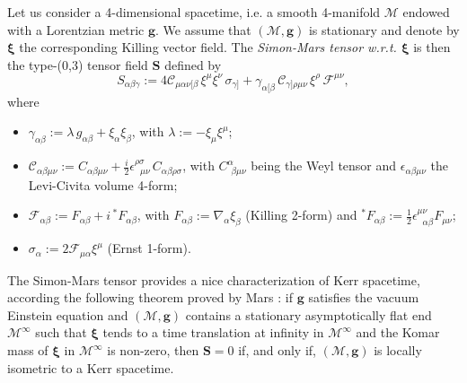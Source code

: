 \documentclass[a4paper]{jpconf}
\newcommand{\be}{\begin{equation}}
\newcommand{\ee}{\end{equation}}
\newcommand{\w}[1]{\bm{#1}}
\begin{document}
Let us consider a 4-dimensional spacetime, i.e. a smooth 
4-manifold $\mathcal{M}$ endowed with a Lorentzian metric $\w{g}$. 
We assume that $(\mathcal{M},\w{g})$ is stationary and denote by $\w{\xi}$ 
the corresponding Killing vector field. 
The \emph{Simon-Mars tensor w.r.t. $\w{\xi}$} is then
the type-(0,3) tensor field $\w{S}$ defined by \cite{Mars99}
\be \label{e:def_Simon-Mars}
S_{\alpha\beta\gamma} := 4 \mathcal{C}_{\mu\alpha\nu[\beta} \, \xi^\mu \xi^\nu \, \sigma_{\gamma]}
 + \gamma_{\alpha[\beta} \, \mathcal{C}_{\gamma]\rho\mu\nu} \, \xi^\rho \, \mathcal{F}^{\mu\nu} ,
\ee
where
\begin{itemize}
\item $\gamma_{\alpha\beta} := \lambda \, g_{\alpha\beta} + \xi_\alpha \xi_\beta$, 
with $\lambda := - \xi_\mu \xi^\mu$;
\item $\mathcal{C}_{\alpha\beta\mu\nu} := C_{\alpha\beta\mu\nu}
    + \frac{i}{2} \epsilon^{\rho\sigma}_{\ \ \, \mu\nu}\,  C_{\alpha\beta\rho\sigma} $,
with $C^\alpha_{\ \, \beta\mu\nu}$ being the Weyl tensor and 
$\epsilon_{\alpha\beta\mu\nu}$ the Levi-Civita volume 4-form;
\item $\mathcal{F}_{\alpha\beta} := F_{\alpha\beta} + i\,  {}^*\!F_{\alpha\beta}$, 
with $F_{\alpha\beta} := \nabla_\alpha\xi_\beta$ (Killing 2-form) and 
${}^*\!F_{\alpha\beta} := \frac{1}{2} \epsilon^{\mu\nu}_{\ \ \, \alpha\beta} F_{\mu\nu}$;
\item $\sigma_\alpha := 2 \mathcal{F}_{\mu\alpha} \xi^\mu$ (Ernst 1-form).
\end{itemize}
The Simon-Mars tensor provides a nice characterization of Kerr spacetime,
according the following theorem proved by Mars \cite{Mars99}:
if $\w{g}$ satisfies the vacuum Einstein equation and $(\mathcal{M},\w{g})$
contains a stationary asymptotically flat end $\mathcal{M}^\infty$ such
that $\w{\xi}$ tends to a time translation at infinity in $\mathcal{M}^\infty$
and the Komar mass of $\w{\xi}$ in $\mathcal{M}^\infty$ is non-zero, then 
$\w{S} = 0$ if, and only if, $(\mathcal{M},\w{g})$ is locally isometric 
to a Kerr spacetime.
\end{document}
